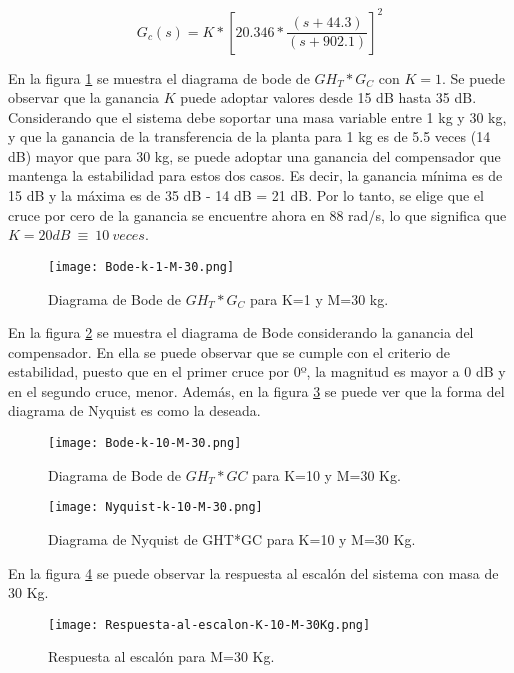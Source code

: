 \begin{equation}  
	G_c(s)=K*{[20.346*\frac{(s+44.3)}{(s+902.1)}]}^2
\end{equation} 

\noindent En la figura \ref{fig:bode-analog-compensado-para-k-1} se muestra el diagrama de bode de ${GH}_T*G_C$ con $K=1$. Se puede observar que la ganancia $K$ puede adoptar valores desde 15 dB hasta 35 dB. Considerando que el sistema debe soportar una masa variable entre 1 kg y 30 kg, y que la ganancia de la transferencia de la planta para 1 kg es de 5.5 veces (14 dB) mayor que para 30 kg, se puede adoptar una ganancia del compensador que mantenga la estabilidad para estos dos casos. Es decir, la ganancia m\'{i}nima es de 15 dB y la m\'{a}xima es de 35 dB - 14 dB = 21 dB. Por lo tanto, se elige que el cruce por cero de la ganancia se encuentre ahora en 88 rad/s, lo que significa que $K=20dB\ \equiv \ 10\ veces$.


\begin{figure}[H]
	\centering
	\texttt{[image: Bode-k-1-M-30.png]}
	\caption{Diagrama de Bode de $GH_T*G_C$ para K=1 y M=30 kg.}
	\label{fig:bode-analog-compensado-para-k-1}
\end{figure}

\noindent En la figura \ref{fig:bode-analog-compensado-para-k-10} se muestra el diagrama de Bode considerando la ganancia del compensador. En ella se puede observar que se  cumple con el criterio de estabilidad, puesto que en el primer cruce por 0º, la magnitud es mayor a 0 dB y en el segundo cruce, menor. Adem\'{a}s, en la figura \ref{fig:nyquist-analog-para-k-10} se puede ver que la forma del diagrama de Nyquist es como la deseada.

\begin{figure}[H]
	\centering
	\texttt{[image: Bode-k-10-M-30.png]}
	\caption{Diagrama de Bode de $GH_{T}*GC$ para K=10 y M=30 Kg.}
	\label{fig:bode-analog-compensado-para-k-10}
\end{figure}

\begin{figure}[H]
	\centering
	\texttt{[image: Nyquist-k-10-M-30.png]}
	\caption{Diagrama de Nyquist de GHT*GC para K=10 y M=30 Kg.}
	\label{fig:nyquist-analog-para-k-10}
\end{figure}

\noindent En la figura \ref{fig:rta-escalon-k-10-m-30} se puede observar la respuesta al escalón del sistema con masa de 30 Kg.

\begin{figure}[H]
	\centering
	\texttt{[image: Respuesta-al-escalon-K-10-M-30Kg.png]}
	\caption{Respuesta al escalón para M=30 Kg.}
	\label{fig:rta-escalon-k-10-m-30}
\end{figure}

